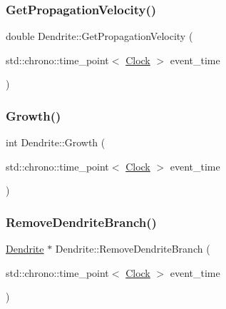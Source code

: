 \mbox{\label{classDendrite_af0315957a349532d25691385b6486e95}} 
\subsubsection{\texorpdfstring{Get\+Propagation\+Velocity()}{GetPropagationVelocity()}}
{\footnotesize\ttfamily double Dendrite\+::\+Get\+Propagation\+Velocity (\begin{DoxyParamCaption}\item[{std\+::chrono\+::time\+\_\+point$<$ \mbox{\hyperlink{universe_8h_a0ef8d951d1ca5ab3cfaf7ab4c7a6fd80}{Clock}} $>$}]{event\+\_\+time }\end{DoxyParamCaption})\hspace{0.3cm}{\ttfamily [inline]}}

\mbox{\label{classDendrite_a6a0c08a642c92d8e189e1f7eff6f6b00}} 
\subsubsection{\texorpdfstring{Growth()}{Growth()}}
{\footnotesize\ttfamily int Dendrite\+::\+Growth (\begin{DoxyParamCaption}\item[{std\+::chrono\+::time\+\_\+point$<$ \mbox{\hyperlink{universe_8h_a0ef8d951d1ca5ab3cfaf7ab4c7a6fd80}{Clock}} $>$}]{event\+\_\+time }\end{DoxyParamCaption})}

\mbox{\label{classDendrite_aa23bd0ce7c5a0a9011b28234cc2e90e1}} 
\subsubsection{\texorpdfstring{Remove\+Dendrite\+Branch()}{RemoveDendriteBranch()}}
{\footnotesize\ttfamily \mbox{\hyperlink{classDendrite}{Dendrite}} $\ast$ Dendrite\+::\+Remove\+Dendrite\+Branch (\begin{DoxyParamCaption}\item[{std\+::chrono\+::time\+\_\+point$<$ \mbox{\hyperlink{universe_8h_a0ef8d951d1ca5ab3cfaf7ab4c7a6fd80}{Clock}} $>$}]{event\+\_\+time }\end{DoxyParamCaption})}

